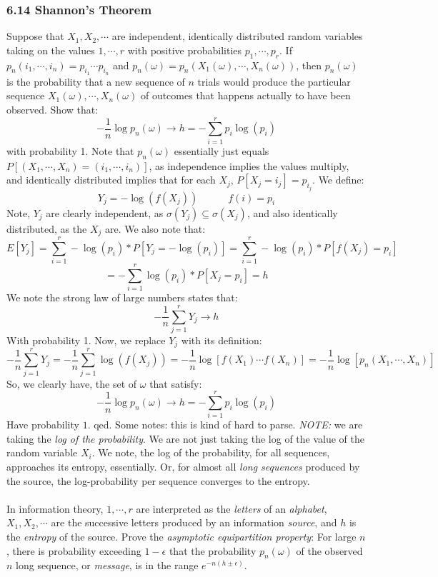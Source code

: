 \documentclass[12pt,a4paper]{article}
\newcommand{\1}[1]{\mathbbm{1}\left\{ #1 \right\}}
\begin{document}
\subsubsection{6.14 Shannon's Theorem} Suppose that $X_1, X_2, \cdots$ are independent, identically distributed random variables taking on the values $1, \cdots, r$ with positive probabilities $p_1, \cdots, p_r$. If $p_n(i_1, \cdots, i_n) = p_{i_1} \cdots p_{i_n}$ and $p_n(\omega) = p_n(X_1(\omega), \cdots, X_n(\omega))$, then $p_n(\omega)$ is the probability that a new sequence of $n$ trials would produce the particular sequence $X_1(\omega), \cdots, X_n(\omega)$ of outcomes that happens actually to have been observed. Show that:
$$
	-\frac{1}{n}\log p_n(\omega) \to h = -\sum_{i=1}^r p_i\log(p_i)
$$
with probability 1. Note that $p_n(\omega)$ essentially just equals $P[(X_1, \cdots, X_n) = (i_1, \cdots, i_n)]$, as independence implies the values multiply, and identically distributed implies that for each $X_j$, $P[X_j = i_j] = p_{i_j}$. We define:
$$
	Y_j = -\log(f(X_j)) \quad\quad\quad
	f(i) = p_i
$$
Note, $Y_j$ are clearly independent, as $\sigma(Y_j) \subseteq \sigma(X_j)$, and also identically distributed, as the $X_j$ are. We also note that:
$$
	E[Y_j] = \sum_{i=1}^r -\log(p_i) * P[Y_j = -\log(p_i)] = \sum_{i=1}^r -\log(p_i) * P[f(X_j) = p_i]
$$
$$
	= -\sum_{i=1}^r \log(p_i) * P[X_j = p_i] = h
$$
We note the strong law of large numbers states that:
$$
	-\frac{1}{n} \sum_{j=1}^r Y_j \to h	
$$
With probability 1. Now, we replace $Y_j$ with its definition:
$$
	-\frac{1}{n} \sum_{j=1}^r Y_j =
	-\frac{1}{n} \sum_{j=1}^r \log(f(X_j)) =
	-\frac{1}{n} \log\left[f(X_1) \cdots f(X_n)\right] =
	-\frac{1}{n} \log\left[p_n(X_1, \cdots, X_n)\right]
$$
So, we clearly have, the set of $\omega$ that satisfy:
$$
	-\frac{1}{n}\log p_n(\omega) \to h = -\sum_{i=1}^r p_i\log(p_i)
$$
Have probability $1$. qed. Some notes: this is kind of hard to parse. \textit{NOTE:} we are taking the \textit{log of the probability}. We are not just taking the log of the value of the random variable $X_i$. We note, the log of the probability, for all sequences, approaches its entropy, essentially. Or, for almost all \textit{long sequences} produced by the source, the log-probability per sequence converges to the entropy.
\\\\
In information theory, $1, \cdots, r$ are interpreted as the \textit{letters} of an \textit{alphabet}, $X_1, X_2, \cdots$ are the successive letters produced by an information \textit{source}, and $h$ is the \textit{entropy} of the source. Prove the \textit{asymptotic equipartition property}: For large $n$, there is probability exceeding $1-\epsilon$ that the probability $p_n(\omega)$ of the observed $n$ long sequence, or \textit{message}, is in the range $e^{-n(h\pm \epsilon)}$.
\end{document}
